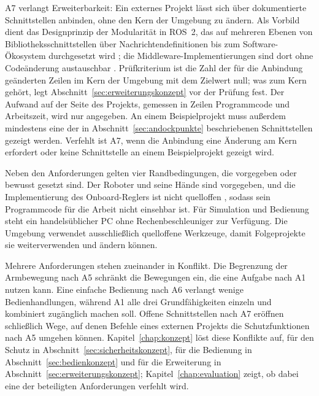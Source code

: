 A7 verlangt Erweiterbarkeit: Ein externes Projekt lässt sich über dokumentierte Schnittstellen anbinden, ohne den Kern der Umgebung zu ändern.
Als Vorbild dient das Designprinzip der Modularität in ROS~2, das auf mehreren Ebenen von Bibliotheksschnittstellen über Nachrichtendefinitionen bis zum Software-Ökosystem durchgesetzt wird \cite{Macenski2022}; die Middleware-Implementierungen sind dort ohne Codeänderung austauschbar \cite{Macenski2022}.
Prüfkriterium ist die Zahl der für die Anbindung geänderten Zeilen im Kern der Umgebung mit dem Zielwert null; was zum Kern gehört, legt Abschnitt~\ref{sec:erweiterungskonzept} vor der Prüfung fest. %
Der Aufwand auf der Seite des Projekts, gemessen in Zeilen Programmcode und Arbeitszeit, wird nur angegeben. %
An einem Beispielprojekt muss außerdem mindestens eine der in Abschnitt~\ref{sec:andockpunkte} beschriebenen Schnittstellen gezeigt werden. %
Verfehlt ist A7, wenn die Anbindung eine Änderung am Kern erfordert oder keine Schnittstelle an einem Beispielprojekt gezeigt wird.

Neben den Anforderungen gelten vier Randbedingungen, die vorgegeben oder bewusst gesetzt sind.
Der Roboter und seine Hände sind vorgegeben, und die Implementierung des Onboard-Reglers ist nicht quelloffen \cite{Hu2026}, sodass sein Programmcode für die Arbeit nicht einsehbar ist.
Für Simulation und Bedienung steht ein handelsüblicher PC ohne Rechenbeschleuniger zur Verfügung.
Die Umgebung verwendet ausschließlich quelloffene Werkzeuge, damit Folgeprojekte sie weiterverwenden und ändern können.

Mehrere Anforderungen stehen zueinander in Konflikt.
Die Begrenzung der Armbewegung nach A5 schränkt die Bewegungen ein, die eine Aufgabe nach A1 nutzen kann.
Eine einfache Bedienung nach A6 verlangt wenige Bedienhandlungen, während A1 alle drei Grundfähigkeiten einzeln und kombiniert zugänglich machen soll.
Offene Schnittstellen nach A7 eröffnen schließlich Wege, auf denen Befehle eines externen Projekts die Schutzfunktionen nach A5 umgehen können.
Kapitel~\ref{chap:konzept} löst diese Konflikte auf, für den Schutz in Abschnitt~\ref{sec:sicherheitskonzept}, für die Bedienung in Abschnitt~\ref{sec:bedienkonzept} und für die Erweiterung in Abschnitt~\ref{sec:erweiterungskonzept}; Kapitel~\ref{chap:evaluation} zeigt, ob dabei eine der beteiligten Anforderungen verfehlt wird.
